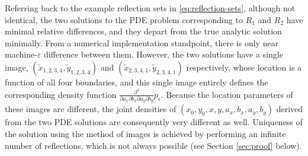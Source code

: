 Referring back to the example reflection sets in
\eqref{eq:reflection-sets}, although not identical, the two solutions
to the PDE problem corresponding to $R_1$ and $R_2$ have minimal
relative differences, and they depart from the true analytic solution
minimally. From a numerical implementation standpoint, there is only
near machine-$\varepsilon$ difference between them. However, the two
solutions have a single image,
$(\tilde{x}_{1,2,3,4}, \tilde{y}_{1,2,3,4})$ and
$(\tilde{x}_{2,3,4,1}, \tilde{y}_{2,3,4,1})$ respectively, whose
location is a function of all four boundaries, and this single image
entirely defines the corresponding density function
$\frac{\partial^4}{\partial a_x \partial b_x \partial a_y
  \partial b_y}p_\epsilon$. Because the location parameters of these images are
different, the joint densities of $(x_0, y_0, x, y, a_x, b_x, a_y, b_y)$
derived from the two PDE solutions are consequently very different as
well. Uniqueness of the solution using the method of images is
achieved by performing an infinite number of reflections, which is not
always possible (see Section \ref{sec:proof} below).

